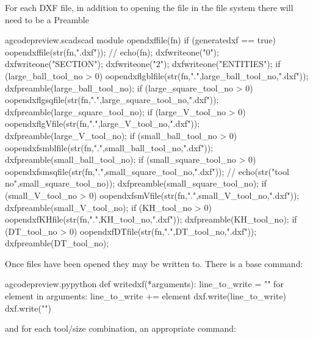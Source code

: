 \documentclass{ltxdoc}
\begin{document}
For each DXF file, in addition to opening the file in the file system there will need to be 
a Preamble

\lstset{firstnumber=\thegcpscad}
\begin{writecode}{a}{gcodepreview.scad}{scad}
module opendxffile(fn) {
if (generatedxf == true) {
	oopendxffile(str(fn,".dxf"));
//    echo(fn);
    dxfwriteone("0");
    dxfwriteone("SECTION");
    dxfwriteone("2");
    dxfwriteone("ENTITIES");
if (large_ball_tool_no >  0) {	oopendxflgblfile(str(fn,".",large_ball_tool_no,".dxf"));
    dxfpreamble(large_ball_tool_no);
} 
if (large_square_tool_no >  0) {	oopendxflgsqfile(str(fn,".",large_square_tool_no,".dxf"));
    dxfpreamble(large_square_tool_no);
} 
if (large_V_tool_no >  0) {	oopendxflgVfile(str(fn,".",large_V_tool_no,".dxf"));
    dxfpreamble(large_V_tool_no);
} 
if (small_ball_tool_no >  0) { oopendxfsmblfile(str(fn,".",small_ball_tool_no,".dxf"));
    dxfpreamble(small_ball_tool_no);
} 
if (small_square_tool_no >  0) {	oopendxfsmsqfile(str(fn,".",small_square_tool_no,".dxf"));
//    echo(str("tool no",small_square_tool_no));
    dxfpreamble(small_square_tool_no);
} 
if (small_V_tool_no >  0) {	oopendxfsmVfile(str(fn,".",small_V_tool_no,".dxf"));
    dxfpreamble(small_V_tool_no);
} 
if (KH_tool_no >  0) {	oopendxfKHfile(str(fn,".",KH_tool_no,".dxf"));
    dxfpreamble(KH_tool_no);
} 
if (DT_tool_no >  0) {	oopendxfDTfile(str(fn,".",DT_tool_no,".dxf"));
    dxfpreamble(DT_tool_no);
} 
}
}

\end{writecode}
\addtocounter{gcpscad}{36}
 
Once files have been opened they may be written to. There is a base command:
 
\lstset{firstnumber=\thegcpy}
\begin{writecode}{a}{gcodepreview.py}{python}
def writedxf(*arguments):
    line_to_write = ""
    for element in arguments:
       line_to_write += element
    dxf.write(line_to_write)
    dxf.write("\n")

\end{writecode}
\addtocounter{gcpy}{7}

\noindent and for each tool/size combination, an appropriate command:
\end{document}
